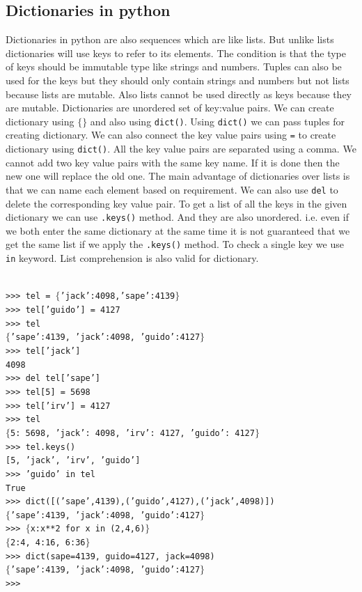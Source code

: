 \documentclass[12pt,a4paper]{article}
\begin{document}
\subsection{Dictionaries in python}
Dictionaries in python are also sequences which are like lists. But unlike lists dictionaries will use keys to refer to its elements. The condition is that the type of keys should be immutable type like strings and numbers. Tuples can also be used for the keys but they should only contain strings and numbers but not lists because lists are mutable. Also lists cannot be used directly as keys because they are mutable. 
Dictionaries are unordered set of key:value pairs. We can create dictionary using \texttt{$\lbrace\rbrace$} and also using \texttt{dict()}. Using \texttt{dict()} we can pass tuples for creating dictionary. We can also connect the key value pairs using \texttt{=} to create dictionary using \texttt{dict()}.  All the key value pairs are separated using a comma. We cannot add two key value pairs with the same key name. If it is done then the new one will replace the old one. The main advantage of dictionaries over lists is that we can name each element based on requirement. We can also use \texttt{del} to delete the corresponding key value pair.  To get  a list of all the keys in the given dictionary we can use \texttt{.keys()} method. And they are also unordered. i.e. even if we both enter the same dictionary at the same time it is not guaranteed that we get the same list if we apply the \texttt{.keys()} method. To check a single key we use \texttt{in} keyword. List comprehension is also valid for dictionary.

\texttt{\\
>>> tel = $\lbrace$'jack'{:}4098,'sape'{:}4139$\rbrace$\\
>>> tel['guido'] = 4127\\
>>> tel\\
$\lbrace$'sape'{:}4139, 'jack'{:}4098, 'guido'{:}4127$\rbrace$\\
>>> tel['jack']\\
4098\\
>>> del tel['sape']\\
>>> tel[5] = 5698\\
>>> tel['irv'] = 4127\\
>>> tel\\
$\lbrace$5{:} 5698, 'jack'{:} 4098, 'irv'{:} 4127, 'guido'{:} 4127$\rbrace$\\
>>> tel.keys()\\
{[5, 'jack', 'irv', 'guido']}\\
>>> 'guido' in tel\\
True\\
>>> dict([('sape',4139),('guido',4127),('jack',4098)])\\
$\lbrace$'sape'{:}4139, 'jack'{:}4098, 'guido'{:}4127$\rbrace$\\
>>> $\lbrace$x{:}x**2 for x in (2,4,6)$\rbrace$\\
$\lbrace$2{:}4, 4{:}16, 6{:}36$\rbrace$\\
>>> dict(sape=4139, guido=4127, jack=4098)\\
$\lbrace$'sape'{:}4139, 'jack'{:}4098, 'guido'{:}4127$\rbrace$\\
>>> }
\end{document}
